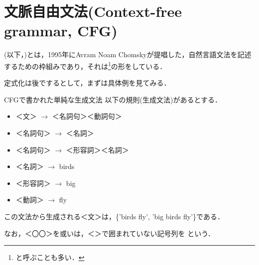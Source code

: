 
\section{文脈自由文法(Context-free grammar, CFG)}
(以下，)とは，1995年にAvram Noam
Chomskyが提唱した，自然言語文法を記述するための枠組みであり，それは\footnote{
と呼ぶことも多い．}の形をしている．

定式化は後でするとして，まずは具体例を見てみる．

\begin{myexample}{CFGで書かれた単純な生成文法} 
以下の規則(生成文法)があるとする．
\begin{itemize}
 \item ＜文＞ $\rightarrow$ ＜名詞句＞＜動詞句＞
 \item ＜名詞句＞ $\rightarrow$ ＜名詞＞
 \item ＜名詞句＞ $\rightarrow$ ＜形容詞＞＜名詞＞
 \item ＜名詞＞ $\rightarrow$ birds
 \item ＜形容詞＞ $\rightarrow$ big
 \item ＜動詞＞ $\rightarrow$ fly
\end{itemize}
この文法から生成される＜文＞は，\{'birds fly', 'big birds fly'\}である．

 なお，＜〇〇＞を或いは，＜＞で囲まれていない記号列を
 という． \footnotemark
\end{myexample} 

